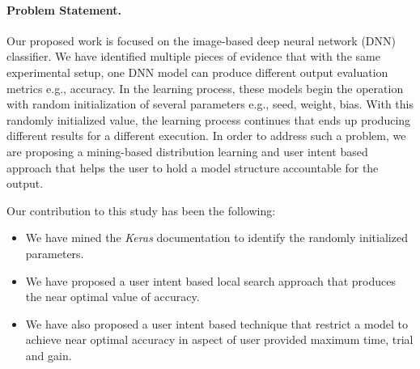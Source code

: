 \paragraph{Problem Statement. }Our proposed work is focused on the image-based deep neural network (DNN) classifier. We have identified multiple pieces of evidence that with the same experimental setup, one DNN model can produce different output evaluation metrics e.g., accuracy. In the learning process, these models begin the operation with random initialization of several parameters e.g., seed, weight, bias. With this randomly initialized value, the learning process continues that ends up producing different results for a different execution. In order to address such a problem, we are proposing a mining-based distribution learning and 
user intent based approach that helps the user to hold a model structure accountable for the output.


Our contribution to this study has been the following:
\begin{itemize}
	\item We have mined the \emph{Keras} documentation to identify the randomly initialized parameters.
	\item We have proposed a user intent based local search approach that produces the near optimal value of accuracy.
	\item We have also proposed a user intent based technique that restrict a model to achieve near optimal accuracy in aspect of user provided maximum time, trial and gain.
\end{itemize}
